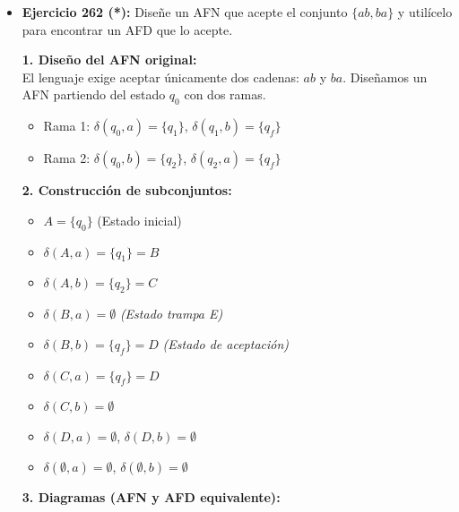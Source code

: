 \documentclass[12pt]{article}
\begin{document}
\begin{itemize}
    \vspace{0.6cm}

    \item \textbf{Ejercicio 262 (*):} Diseñe un AFN que acepte el conjunto $\{ab, ba\}$ y utilícelo para encontrar un AFD que lo acepte.

    \textbf{1. Diseño del AFN original:} \\
    El lenguaje exige aceptar únicamente dos cadenas: $ab$ y $ba$. Diseñamos un AFN partiendo del estado $q_0$ con dos ramas.
    \begin{itemize}
        \item Rama 1: $\delta(q_0, a) = \{q_1\}$, $\delta(q_1, b) = \{q_f\}$
        \item Rama 2: $\delta(q_0, b) = \{q_2\}$, $\delta(q_2, a) = \{q_f\}$
    \end{itemize}

    \textbf{2. Construcción de subconjuntos:}
    \begin{itemize}
        \item $A = \{q_0\}$ (Estado inicial)
        \item $\delta(A, a) = \{q_1\} = B$
        \item $\delta(A, b) = \{q_2\} = C$
        \item $\delta(B, a) = \emptyset$ \textit{(Estado trampa E)}
        \item $\delta(B, b) = \{q_f\} = D$ \textit{(Estado de aceptación)}
        \item $\delta(C, a) = \{q_f\} = D$
        \item $\delta(C, b) = \emptyset$
        \item $\delta(D, a) = \emptyset$, $\delta(D, b) = \emptyset$
        \item $\delta(\emptyset, a) = \emptyset$, $\delta(\emptyset, b) = \emptyset$
    \end{itemize}

    \textbf{3. Diagramas (AFN y AFD equivalente):}
    \begin{center}
\end{center}
\end{itemize}
\end{document}
